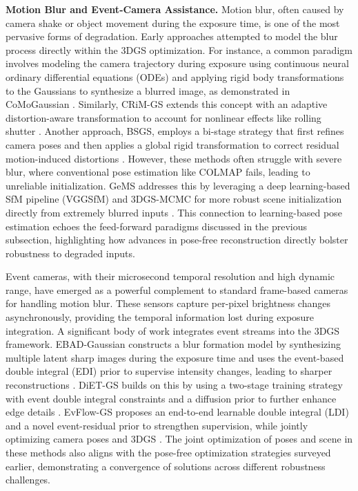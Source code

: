 \documentclass[11pt]{article}
\begin{document}
\textbf{Motion Blur and Event-Camera Assistance.} Motion blur, often caused by camera shake or object movement during the exposure time, is one of the most pervasive forms of degradation. Early approaches attempted to model the blur process directly within the 3DGS optimization. For instance, a common paradigm involves modeling the camera trajectory during exposure using continuous neural ordinary differential equations (ODEs) and applying rigid body transformations to the Gaussians to synthesize a blurred image, as demonstrated in CoMoGaussian \cite{ref283}. Similarly, CRiM-GS extends this concept with an adaptive distortion-aware transformation to account for nonlinear effects like rolling shutter \cite{ref284}. Another approach, BSGS, employs a bi-stage strategy that first refines camera poses and then applies a global rigid transformation to correct residual motion-induced distortions \cite{ref285}. However, these methods often struggle with severe blur, where conventional pose estimation like COLMAP fails, leading to unreliable initialization. GeMS addresses this by leveraging a deep learning-based SfM pipeline (VGGSfM) and 3DGS-MCMC for more robust scene initialization directly from extremely blurred inputs \cite{ref278}. This connection to learning-based pose estimation echoes the feed-forward paradigms discussed in the previous subsection, highlighting how advances in pose-free reconstruction directly bolster robustness to degraded inputs.

Event cameras, with their microsecond temporal resolution and high dynamic range, have emerged as a powerful complement to standard frame-based cameras for handling motion blur. These sensors capture per-pixel brightness changes asynchronously, providing the temporal information lost during exposure integration. A significant body of work integrates event streams into the 3DGS framework. EBAD-Gaussian constructs a blur formation model by synthesizing multiple latent sharp images during the exposure time and uses the event-based double integral (EDI) prior to supervise intensity changes, leading to sharper reconstructions \cite{ref286}. DiET-GS builds on this by using a two-stage training strategy with event double integral constraints and a diffusion prior to further enhance edge details \cite{ref287}. EvFlow-GS proposes an end-to-end learnable double integral (LDI) and a novel event-residual prior to strengthen supervision, while jointly optimizing camera poses and 3DGS \cite{ref288}. The joint optimization of poses and scene in these methods also aligns with the pose-free optimization strategies surveyed earlier, demonstrating a convergence of solutions across different robustness challenges.
\end{document}
